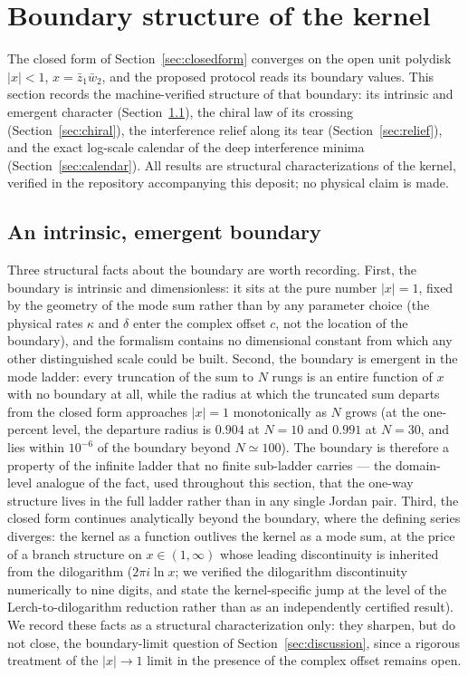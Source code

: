 \documentclass[11pt,a4paper]{article}
\newcommand{\zbone}{\bar{z}_1}
\newcommand{\wbtwo}{\bar{w}_2}
\begin{document}
\section{Boundary structure of the kernel}
\label{sec:boundary}

The closed form of Section~\ref{sec:closedform} converges on the open unit
polydisk $|x| < 1$, $x = \zbone\wbtwo$, and the proposed protocol reads its
boundary values. This section records the machine-verified structure of that
boundary: its intrinsic and emergent character
(Section~\ref{sec:wall}), the chiral law of its crossing
(Section~\ref{sec:chiral}), the interference relief along its tear
(Section~\ref{sec:relief}), and the exact log-scale calendar of the deep
interference minima (Section~\ref{sec:calendar}). All results are
structural characterizations of the kernel, verified in the repository
accompanying this deposit; no physical claim is made.

\subsection{An intrinsic, emergent boundary}
\label{sec:wall}

Three structural facts about the boundary are worth
recording. First, the boundary is intrinsic and dimensionless: it sits at the
pure number $|x| = 1$, fixed by the geometry of the mode sum rather than by
any parameter choice (the physical rates $\kappa$ and $\delta$ enter the
complex offset $c$, not the location of the boundary), and the formalism
contains no dimensional constant from which any other distinguished scale
could be built. Second, the boundary is emergent in the mode ladder: every
truncation of the sum to $N$ rungs is an entire function of $x$ with no
boundary at all, while the radius at which the truncated sum departs from
the closed form approaches $|x| = 1$ monotonically as $N$ grows (at the
one-percent level, the departure radius is $0.904$ at $N = 10$ and $0.991$
at $N = 30$, and lies within $10^{-6}$ of the boundary beyond
$N \simeq 100$). The boundary is therefore a property of the infinite
ladder that no finite sub-ladder carries --- the domain-level analogue of
the fact, used throughout this section, that the one-way structure lives in
the full ladder rather than in any single Jordan pair. Third, the closed
form continues analytically beyond the boundary, where the defining series
diverges: the kernel as a function outlives the kernel as a mode sum, at
the price of a branch structure on $x \in (1, \infty)$ whose leading
discontinuity is inherited from the dilogarithm ($2\pi i \ln x$; we
verified the dilogarithm discontinuity numerically to nine digits, and
state the kernel-specific jump at the level of the Lerch-to-dilogarithm
reduction rather than as an independently certified result). We record
these facts as a structural characterization only: they sharpen, but do
not close, the boundary-limit question of Section~\ref{sec:discussion},
since a rigorous treatment of the $|x| \to 1$ limit in the presence of the
complex offset remains open.
\end{document}
